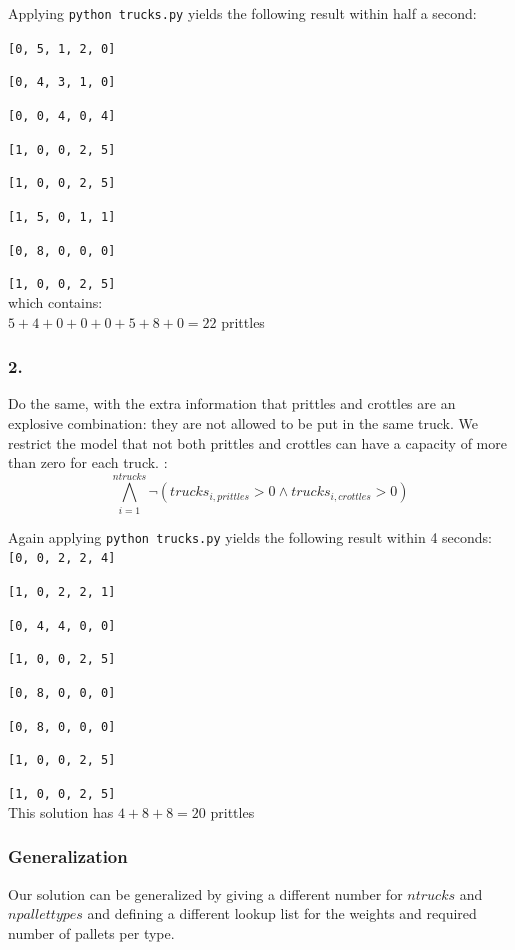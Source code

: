 \documentclass[12pt]{article}
\begin{document}
Applying {\tt python trucks.py} yields the following result within half a second:
 
{\tt [0, 5, 1, 2, 0] }

{\tt [0, 4, 3, 1, 0] }

{\tt [0, 0, 4, 0, 4] }

{\tt [1, 0, 0, 2, 5] }

{\tt [1, 0, 0, 2, 5] }

{\tt [1, 5, 0, 1, 1] }

{\tt [0, 8, 0, 0, 0] }

{\tt [1, 0, 0, 2, 5] } \\

which contains:\\
$ 5 + 4 + 0 + 0 + 0 + 5 + 8 + 0  = 22 $ prittles

\subsubsection*{2.}

Do the same, with the extra information that prittles and crottles are an explosive
combination: they are not allowed to be put in the same truck.
We restrict the model that not both prittles and crottles can have a capacity of more than zero for each truck. :
\[ \bigwedge_{i=1}^{ntrucks} \neg (trucks_{i,prittles}>0 \wedge trucks_{i,crottles}>0) \]


Again applying {\tt python trucks.py} yields the following result within 4 seconds: \\

{\tt [0, 0, 2, 2, 4] }

{\tt [1, 0, 2, 2, 1] }

{\tt [0, 4, 4, 0, 0] }

{\tt [1, 0, 0, 2, 5] }

{\tt [0, 8, 0, 0, 0] }

{\tt [0, 8, 0, 0, 0] }

{\tt [1, 0, 0, 2, 5] }

{\tt [1, 0, 0, 2, 5] } \\

This solution has $ 4 + 8 + 8 = 20 $ prittles

\subsubsection*{Generalization}

Our solution can be generalized by giving a different number for $ntrucks$ and $npallettypes$ and defining a different lookup list for the weights and required number of pallets per type.
\end{document}
